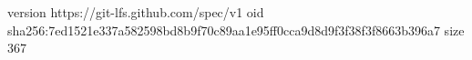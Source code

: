 version https://git-lfs.github.com/spec/v1
oid sha256:7ed1521e337a582598bd8b9f70c89aa1e95ff0cca9d8d9f3f38f3f8663b396a7
size 367
